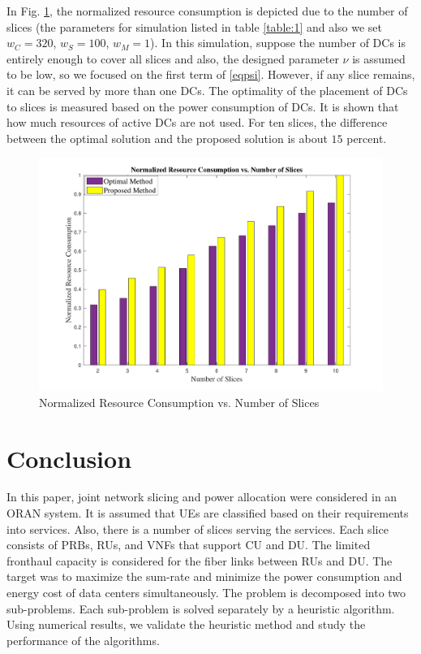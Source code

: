 \documentclass[conference]{IEEEtran}
\begin{document}
In Fig. \ref{fig:f2}, the normalized resource consumption is depicted due to the number of slices (the parameters for simulation listed in table \ref{table:1} and also we set $w_C = 320$, $w_S = 100$, $w_M =1$). In this simulation, suppose the number of DCs is entirely enough to cover all slices and also, the designed parameter $\nu$ is assumed to be low, so we focused on the first term of \eqref{eqpsi}. However, if any slice remains, it can be served by more than one DCs. The optimality of the placement of DCs to slices is measured based on the power consumption of DCs. It is shown that how much resources of active DCs are not used. For ten slices, the difference between the optimal solution and the proposed solution is about $15$ percent.
\begin{figure}%
  \centering
    \includegraphics[width=\linewidth]{fig22_last}
  \caption{Normalized Resource Consumption vs. Number of Slices}
  \label{fig:f2}
\end{figure}
\section{Conclusion}
In this paper, joint network slicing and power allocation were considered in an ORAN system. It is assumed that UEs are classified based on their requirements into services. Also, there is a number of slices serving the services. Each slice consists of PRBs, RUs, and VNFs that support CU and DU. The limited fronthaul capacity is considered for the fiber links between RUs and DU.
The target was to maximize the sum-rate and minimize the power consumption and energy cost of data centers simultaneously.
The problem is decomposed into two sub-problems. Each sub-problem is solved separately by a heuristic algorithm. Using numerical results, we validate the heuristic method and study the performance of the algorithms. %




\end{document}
